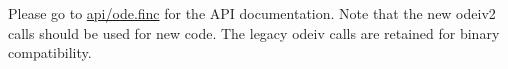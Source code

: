 Please go to \hyperlink{ode_8finc}{api/ode.\-finc} for the A\-P\-I documentation. Note that the new odeiv2 calls should be used for new code. The legacy odeiv calls are retained for binary compatibility. 